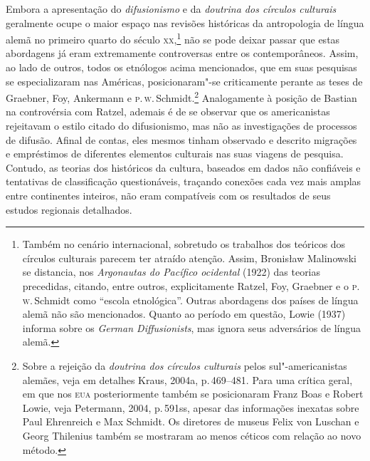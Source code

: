 Embora a apresentação do \textit{difusionismo} e da \textit{doutrina dos círculos
culturais} geralmente ocupe o maior espaço nas revisões históricas da
antropologia de língua alemã no primeiro quarto do século \textsc{xx},\footnote{Também
  no cenário internacional, sobretudo os trabalhos dos teóricos dos
  círculos culturais parecem ter atraído atenção. Assim, Bronisław
  Malinowski se distancia, nos \textit{Argonautas do Pacífico ocidental}
  (1922) das teorias precedidas, citando, entre outros, explicitamente
  Ratzel, Foy, Graebner e o \textsc{p}.\,\textsc{w}.\,Schmidt como ``escola etnológica''.
  Outras abordagens dos países de língua alemã não são mencionados.
  Quanto ao período em questão, Lowie (1937) informa sobre os
  \textit{German Diffusionists}, mas ignora seus adversários de língua
  alemã.} não se pode deixar passar que estas abordagens já eram
extremamente controversas entre os contemporâneos. Assim, ao lado de
outros, todos os etnólogos acima mencionados, que em suas pesquisas se
especializaram nas Américas, posicionaram"-se criticamente perante as
teses de Graebner, Foy, Ankermann e \textsc{p}.\,\textsc{w}.\,Schmidt.\footnote{Sobre a
  rejeição da \textit{doutrina dos círculos culturais} pelos
  sul"-americanistas alemães, veja em detalhes Kraus, 2004a, p.\,469--481.
  Para uma crítica geral, em que nos \textsc{eua} posteriormente também
  se posicionaram Franz Boas e Robert Lowie, veja Petermann, 2004, p.\,591ss, apesar das informações inexatas sobre Paul Ehrenreich e Max
  Schmidt. Os diretores de museus Felix von Luschan e Georg
  Thilenius também se mostraram ao menos céticos com relação
  ao novo método.} Analogamente à posição de Bastian na controvérsia com
Ratzel, ademais é de se observar que os americanistas rejeitavam o
estilo citado do difusionismo, mas não as investigações de processos de
difusão. Afinal de contas, eles mesmos tinham observado e descrito
migrações e empréstimos de diferentes elementos culturais nas suas
viagens de pesquisa. Contudo, as teorias dos históricos da cultura,
baseados em dados não confiáveis e tentativas de classificação
questionáveis, traçando conexões cada vez mais amplas entre continentes
inteiros, não eram compatíveis com os resultados de seus estudos
regionais detalhados.

